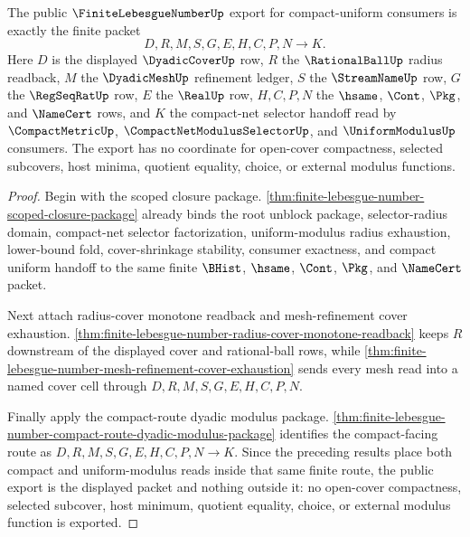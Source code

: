\begin{theorem}
\label{thm:finite-lebesgue-number-public-compact-uniform-export}
The public $\FiniteLebesgueNumberUp$ export for compact-uniform consumers is exactly the finite packet
$$
D,R,M,S,G,E,H,C,P,N \to K .
$$
Here $D$ is the displayed $\DyadicCoverUp$ row, $R$ the $\RationalBallUp$ radius readback, $M$ the $\DyadicMeshUp$ refinement ledger, $S$ the $\StreamNameUp$ row, $G$ the $\RegSeqRatUp$ row, $E$ the $\RealUp$ row, $H,C,P,N$ the $\hsame$, $\Cont$, $\Pkg$, and $\NameCert$ rows, and $K$ the compact-net selector handoff read by $\CompactMetricUp$, $\CompactNetModulusSelectorUp$, and $\UniformModulusUp$ consumers. The export has no coordinate for open-cover compactness, selected subcovers, host minima, quotient equality, choice, or external modulus functions.
\end{theorem}
\begin{proof}
Begin with the scoped closure package. \autoref{thm:finite-lebesgue-number-scoped-closure-package} already binds the root unblock package, selector-radius domain, compact-net selector factorization, uniform-modulus radius exhaustion, lower-bound fold, cover-shrinkage stability, consumer exactness, and compact uniform handoff to the same finite $\BHist$, $\hsame$, $\Cont$, $\Pkg$, and $\NameCert$ packet.

Next attach radius-cover monotone readback and mesh-refinement cover exhaustion. \autoref{thm:finite-lebesgue-number-radius-cover-monotone-readback} keeps $R$ downstream of the displayed cover and rational-ball rows, while \autoref{thm:finite-lebesgue-number-mesh-refinement-cover-exhaustion} sends every mesh read into a named cover cell through $D,R,M,S,G,E,H,C,P,N$.

Finally apply the compact-route dyadic modulus package. \autoref{thm:finite-lebesgue-number-compact-route-dyadic-modulus-package} identifies the compact-facing route as $D,R,M,S,G,E,H,C,P,N \to K$. Since the preceding results place both compact and uniform-modulus reads inside that same finite route, the public export is the displayed packet and nothing outside it: no open-cover compactness, selected subcover, host minimum, quotient equality, choice, or external modulus function is exported.
\end{proof}

